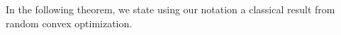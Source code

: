 %
In the following theorem, we state using our notation a classical result from random convex optimization.
